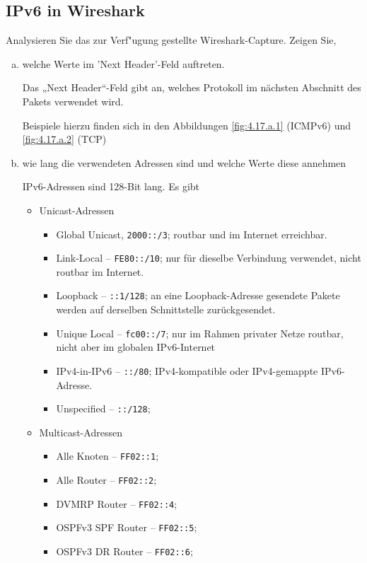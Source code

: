 \setcounter{section}{4}
\setcounter{subsection}{16}
\subsection{IPv6 in Wireshark}

Analysieren Sie das zur Verf"ugung gestellte Wireshark-Capture. Zeigen Sie,
\begin{enumerate}[(a)]
    \item welche Werte im 'Next Header'-Feld auftreten.

        Das „Next Header“-Feld gibt an, welches Protokoll im nächsten Abschnitt
        des Pakets verwendet wird.

        Beispiele hierzu finden sich in den Abbildungen \ref{fig:4.17.a.1}
        (ICMPv6) und \ref{fig:4.17.a.2} (TCP)

    \item wie lang die verwendeten Adressen sind und welche Werte diese annehmen

        IPv6-Adressen sind 128-Bit lang. Es gibt
        \begin{itemize}
            \item Unicast-Adressen
                \begin{itemize}
                    \item Global Unicast, \verb|2000::/3|; routbar und im Internet erreichbar.
                    \item Link-Local -- \verb|FE80::/10|; nur für dieselbe Verbindung verwendet, nicht routbar im Internet.
                    \item Loopback -- \verb|::1/128|; an eine Loopback-Adresse gesendete Pakete werden auf derselben Schnittstelle zurückgesendet.
                    \item Unique Local -- \verb|fc00::/7|; nur im Rahmen privater Netze routbar, nicht aber im globalen IPv6-Internet
                    \item IPv4-in-IPv6 -- \verb|::/80|; IPv4-kompatible oder IPv4-gemappte IPv6-Adresse.
                    \item Unspecified -- \verb|::/128|;
                \end{itemize}
            \item Multicast-Adressen
                \begin{itemize}
                    \item Alle Knoten -- \verb|FF02::1|;
                    \item Alle Router -- \verb|FF02::2|;
                    \item DVMRP Router -- \verb|FF02::4|;
                    \item OSPFv3 SPF Router -- \verb|FF02::5|;
                    \item OSPFv3 DR Router -- \verb|FF02::6|;


\end{itemize}
\end{itemize}
\end{enumerate}
